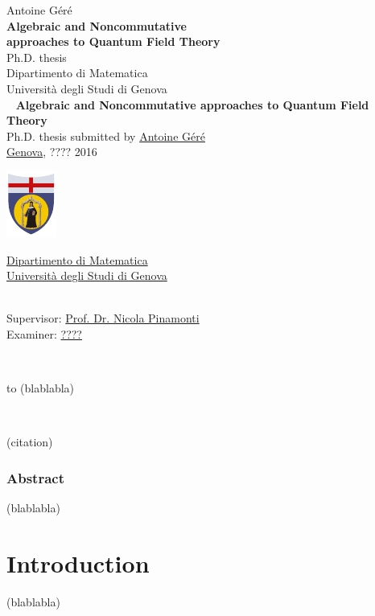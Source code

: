 \documentclass[10pt]{book}
\makeatletter
\newcommand*{\makepagetitle}{%
%
{\raggedright%
%
%
%
%
\thispagestyle{empty}%
%
\vspace*{50pt}
%
{\LARGE Antoine Géré}\\%
%
\vspace*{120pt}%
%
{\Huge\bfseries Algebraic and Noncommutative \\[8pt] approaches to Quantum Field Theory}\\[\baselineskip]%
%
\vspace*{60pt}%
%
{\LARGE Ph.D. thesis}\\[\baselineskip]%
%
\vspace*{60pt}%
%
{\LARGE Dipartimento di Matematica}\\[\baselineskip]%
%
\vspace*{1pt}
%
{\LARGE Università degli Studi di Genova}\\[\baselineskip]%
%
\vfill%
%
%
%
%
%
%
\newpage%
%
\thispagestyle{empty}%
%
\ \vfill%
%
%
\textbf{Algebraic and Noncommutative approaches to Quantum Field Theory} \\[2pt]
Ph.D. thesis submitted by \href{mailto:gere@dima.unige.it}{Antoine Géré} \\[1pt]
\href{http://www.comune.genova.it/}{Genova}, ???? 2016 \\[10pt]
%
%
\begin{minipage}{0.1\linewidth}
\includegraphics[scale=1]{unige.pdf}
\end{minipage}
%
\begin{minipage}{0.85\linewidth}
\href{http://www.dima.unige.it/}{Dipartimento di Matematica} \\[1pt]
\href{http://www.unige.it/}{Università degli Studi di Genova}
\end{minipage}
%
%
\vspace*{10pt} \\
Supervisor: \href{mailto:pinamont@dima.unige.it}{Prof. Dr. Nicola Pinamonti} \\[1pt]
%
Examiner: \href{mailto:????@????.com}{????}
%
%
%
%
%
}%
%
}%
\theoremstyle{break}
\makeatother
\begin{document}




\makepagetitle


\newpage




\ \vfill


\begin{flushright}
to (blablabla) 
\end{flushright}


\vfill




\newpage


\ \vfill


\begin{flushright}
(citation)
\end{flushright}


\vfill




\newpage


\vspace*{100pt}


\thispagestyle{empty}


\section*{Abstract}


(blablabla)




\tableofcontents




\part*{Introduction}








(blablabla)


\end{document}
